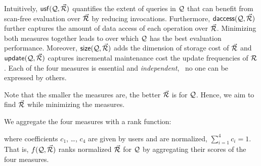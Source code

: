 \vspace{1ex}
Intuitively, ${\mathsf{usf}}(\mathcal Q,\vec{{\mathcal R}})$ quantifies the extent of queries in $\mathcal Q$
that can benefit from scan-free evaluation over $\vec{{\mathcal R}}$ %
by reducing \get invocations.
Furthermore, ${\mathsf{daccess}}(\mathcal Q, \vec{{\mathcal R}})$ further captures the
amount of data access of each \get operation over $\vec{{\mathcal R}}$.
Minimizing both measures together leads to \bdss over which $\mathcal Q$
has the best evaluation performance. Moreover,
${\mathsf{size}}(\mathcal Q, \vec{{\mathcal R}})$ adds the dimension of
storage cost of $\vec{{\mathcal R}}$ and ${\mathsf{update}}(\mathcal Q, \vec{{\mathcal R}})$ captures incremental
maintenance cost \wrt the update frequencies of ${\mathcal R}$. Each of the
four measures is essential and {\em independent}, \ie~no one
can be expressed by others.


\vspace{0.6ex}
Note that the smaller the measures are, the better
$\vec{{\mathcal R}}$ is for $\mathcal Q$. Hence, we aim to find $\vec{{\mathcal R}}$ while
minimizing the measures.



We aggregate the four measures
with a rank function:

\vspace{-0.7ex}
\vspace{-0.7ex}

\noindent
where coefficients $c_{1}$, \ldots, $c_{4}$ are given by 
users and are normalized, \ie $\textstyle\sum_{i=1}^{4}c_{i} = 1$.
That is,  $f(\mathcal Q,\allowbreak \vec{{\mathcal R}})$ ranks normalized \bdss $\vec{{\mathcal R}}$ for $\mathcal Q$ by 
aggregating their scores of the four measures.




